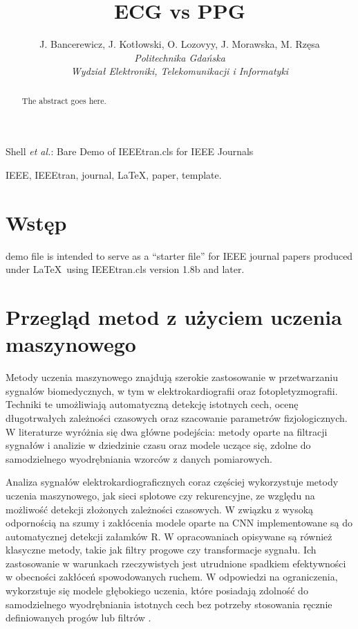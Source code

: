 \documentclass[journal]{IEEEtran}
\begin{document}
\title{ECG vs PPG}
\author{
    J. Bancerewicz, J. Kotłowski, O. Lozovyy, J. Morawska, M. Rzęsa\\
    \textit{Politechnika Gdańska}\\
    \textit{Wydział Elektroniki, Telekomunikacji i Informatyki}
}


\markboth{}%
{Shell \MakeLowercase{\textit{et al.}}: Bare Demo of IEEEtran.cls for IEEE Journals}
\maketitle

\begin{abstract}
The abstract goes here.
\end{abstract}

\begin{IEEEkeywords}
IEEE, IEEEtran, journal, \LaTeX, paper, template.
\end{IEEEkeywords}

\IEEEpeerreviewmaketitle



\section{Wstęp}

 demo file is intended to serve as a ``starter file''
for IEEE journal papers produced under \LaTeX\ using
IEEEtran.cls version 1.8b and later.

\newpage
\section{Przegląd metod z użyciem uczenia maszynowego}

Metody uczenia maszynowego znajdują szerokie zastosowanie w przetwarzaniu sygnałów biomedycznych, w tym w elektrokardiografii oraz fotopletyzmografii. Techniki te umożliwiają automatyczną detekcję istotnych cech, ocenę długotrwałych zależności czasowych oraz szacowanie parametrów fizjologicznych. W literaturze wyróżnia się dwa główne podejścia: metody oparte na filtracji sygnałów i analizie w dziedzinie czasu oraz modele uczące się, zdolne do samodzielnego wyodrębniania wzorców z danych pomiarowych.

Analiza sygnałów elektrokardiograficznych coraz częściej wykorzystuje metody uczenia maszynowego, jak sieci splotowe czy rekurencyjne, ze względu na możliwość detekcji złożonych zależności czasowych. W związku z wysoką odpornością na szumy i zakłócenia modele oparte na CNN implementowane są do automatycznej detekcji załamków R. W opracowaniach opisywane są również klasyczne metody, takie jak filtry progowe czy transformacje sygnału. Ich zastosowanie w warunkach rzeczywistych jest utrudnione spadkiem efektywności w obecności zakłóceń spowodowanych ruchem. W odpowiedzi na ograniczenia, wykorzstuje się modele głębokiego uczenia, które posiadają zdolność do samodzielnego wyodrębniania istotnych cech bez potrzeby stosowania ręcznie definiowanych progów lub filtrów \cite{1}.
\end{document}
